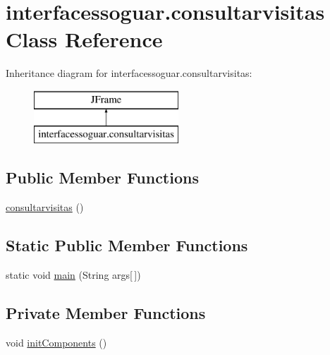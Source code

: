 \hypertarget{classinterfacessoguar_1_1consultarvisitas}{}\section{interfacessoguar.\+consultarvisitas Class Reference}
\label{classinterfacessoguar_1_1consultarvisitas}
Inheritance diagram for interfacessoguar.\+consultarvisitas\+:\begin{figure}[H]
\begin{center}
\leavevmode
\includegraphics[height=2.000000cm]{classinterfacessoguar_1_1consultarvisitas}
\end{center}
\end{figure}
\subsection*{Public Member Functions}
\begin{DoxyCompactItemize}
\item 
\mbox{\hyperlink{classinterfacessoguar_1_1consultarvisitas_a88f7aaa7f944326398e3be28f0f046b7}{consultarvisitas}} ()
\end{DoxyCompactItemize}
\subsection*{Static Public Member Functions}
\begin{DoxyCompactItemize}
\item 
static void \mbox{\hyperlink{classinterfacessoguar_1_1consultarvisitas_af12086ef01e9970a7f7b6c94a81e843b}{main}} (String args\mbox{[}$\,$\mbox{]})
\end{DoxyCompactItemize}
\subsection*{Private Member Functions}
\begin{DoxyCompactItemize}
\item 
void \mbox{\hyperlink{classinterfacessoguar_1_1consultarvisitas_a7d0aee641984608c0e784f282f761d03}{init\+Components}} ()
\end{DoxyCompactItemize}
